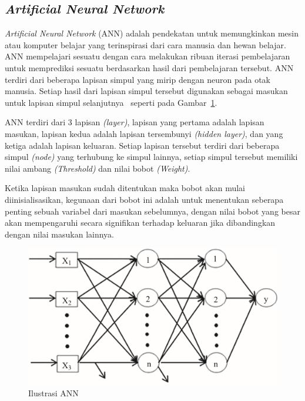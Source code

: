 \subsection{\emph{Artificial Neural Network}}
\emph{Artificial Neural Network} (ANN) adalah pendekatan untuk memungkinkan mesin atau komputer
belajar yang terinspirasi dari cara manusia dan hewan belajar. ANN mempelajari sesuatu dengan cara
melakukan ribuan iterasi pembelajaran untuk memprediksi sesuatu berdasarkan hasil dari pembelajaran
tersebut. ANN terdiri dari beberapa lapisan simpul yang mirip dengan neuron pada otak manusia. Setiap
hasil dari lapisan simpul tersebut digunakan sebagai masukan untuk lapisan simpul selanjutnya~\citep{Desai2021}
seperti pada Gambar~\ref{fig:ann_illustration}.

ANN terdiri dari 3 lapisan \emph{(layer)}, lapisan yang pertama adalah lapisan masukan, lapisan kedua
adalah lapisan tersembunyi \emph{(hidden layer)}, dan yang ketiga adalah lapisan keluaran. Setiap lapisan
tersebut terdiri dari beberapa simpul \emph{(node)} yang terhubung ke simpul lainnya, setiap simpul
tersebut memiliki nilai ambang \emph{(Threshold)} dan nilai bobot \emph{(Weight)}.

Ketika lapisan masukan sudah ditentukan maka bobot akan mulai diinisialisasikan, kegunaan
dari bobot ini adalah untuk menentukan seberapa penting sebuah variabel dari masukan sebelumnya, dengan
nilai bobot yang besar akan mempengaruhi secara signifikan terhadap keluaran jika dibandingkan dengan
nilai masukan lainnya.


\begin{figure}[H]
      \centering
      \includegraphics[scale=1]{assets/artificial_neural_network_structure.png}
      \caption{Ilustrasi ANN~\citep{Sairamya2019}}
      \label{fig:ann_illustration}
\end{figure}

